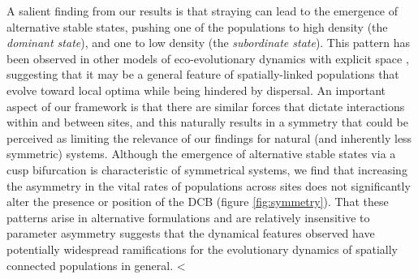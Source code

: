\documentclass{revtex4}
\begin{document}
A salient finding from our results is that straying can lead to the emergence of alternative stable states, pushing one of the populations to high density (the \emph{dominant state}), and one to low density (the \emph{subordinate state}).
This pattern has been observed in other models of eco-evolutionary dynamics with explicit space \citep{Ronce:2001dp}, suggesting that it may be a general feature of spatially-linked populations that evolve toward local optima while being hindered by dispersal.
An important aspect of our framework is that there are similar forces that dictate interactions within and between sites, and this naturally results in a symmetry that could be perceived as limiting the relevance of our findings for natural (and inherently less symmetric) systems.
Although the emergence of alternative stable states via a cusp bifurcation is characteristic of symmetrical systems, we find that increasing the asymmetry in the vital rates of populations across sites does not significantly alter the presence or position of the DCB (figure \ref{fig:symmetry}).
That these patterns arise in alternative formulations and are relatively insensitive to parameter asymmetry suggests that the dynamical features observed have potentially widespread ramifications for the evolutionary dynamics of spatially connected populations in general.
<%


% 
\end{document}

